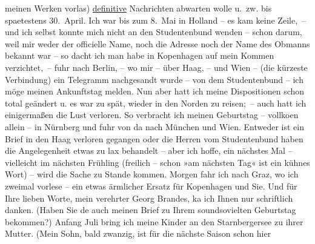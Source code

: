\begin{ledgroupsized}[t]{13cm}
               meinen Werken vorlas) \uline{definitive}{ } Nachrichten abwarten wolle u. zw. bis spaetestens
                  30. April. Ich war bis zum 8. Mai in Holland – es kam keine Zeile, – und ich selbst konnte mich nicht
               an den Studentenbund wenden – schon darum, weil mir weder der officielle Name, noch
               die Adresse noch der Name des Obmanns {\pb}bekannt war
               – so dacht ich man habe in Kopenhagen auf mein
               Kommen verzichtet, – fuhr nach Berlin, – wo mir –
               über Haag, – und Wien – (die kürzeste Verbindung) ein Telegramm nachgesandt wurde – von dem
               Studentenbund – ich möge meinen Ankunftstag melden. Nun aber hatt ich meine
               Dispositionen schon total geändert u. es war zu spät, wieder in den Norden zu
               reisen; – auch hatt ich einigermaßen die Lust verloren. So verbracht ich meinen
               Geburtstag – vollko{\geminationm}en allein – in Nürnberg und fuhr von da nach München und Wien. Entweder ist ein Brief
               in den Haag verloren gegangen oder die Herren
               vom Studentenbund haben die Angelegenheit etwas zu lax behandelt – aber ich hoffe,
               ein nächstes Mal – vielleicht im nächsten Frühling (freilich – schon »am nächsten
               Tag« ist ein kühnes Wort) – wird die Sache zu Stande kommen. {\pb}Morgen fahr ich nach Graz, wo ich zweimal vorlese – ein etwas ärmlicher Ersatz für
                  Kopenhagen und Sie.\pend
           \pstart
           Und für Ihre lieben Worte, mein verehrter Georg Brandes, ka{\geminationn} ich Ihnen nur schriftlich danken. (Haben Sie de{\geminationn} auch meinen Brief zu Ihrem soundsovielten Geburtstag
               bekommen?)\pend
           \pstart
           Anfang Juli bring ich meine Kinder an den Starnbergersee zu ihrer Mutter. (Mein Sohn, bald zwanzig, ist für die nächste Saison schon hier

\end{ledgroupsized}
